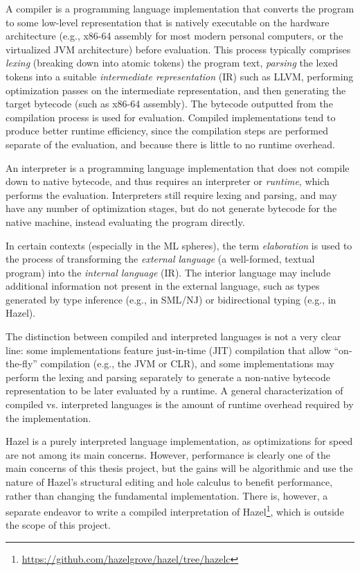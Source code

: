 A compiler is a programming language implementation that converts the program to some low-level representation that is natively executable on the hardware architecture (e.g., x86-64 assembly for most modern personal computers, or the virtualized JVM architecture) before evaluation. This process typically comprises \textit{lexing} (breaking down into atomic tokens) the program text, \textit{parsing} the lexed tokens into a suitable \textit{intermediate representation} (IR) such as LLVM, performing optimization passes on the intermediate representation, and then generating the target bytecode (such as x86-64 assembly). The bytecode outputted from the compilation process is used for evaluation. Compiled implementations tend to produce better runtime efficiency, since the compilation steps are performed separate of the evaluation, and because there is little to no runtime overhead.

An interpreter is a programming language implementation that does not compile down to native bytecode, and thus requires an interpreter or \textit{runtime}, which performs the evaluation. Interpreters still require lexing and parsing, and may have any number of optimization stages, but do not generate bytecode for the native machine, instead evaluating the program directly.


In certain contexts (especially in the ML spheres), the term \textit{elaboration} is used to the process of transforming the \textit{external language} (a well-formed, textual program) into the \textit{internal language} (IR). The interior language may include additional information not present in the external language, such as types generated by type inference (e.g., in SML/NJ) or bidirectional typing (e.g., in Hazel).

The distinction between compiled and interpreted languages is not a very clear line: some implementations feature just-in-time (JIT) compilation that allow ``on-the-fly'' compilation (e.g., the JVM or CLR), and some implementations may perform the lexing and parsing separately to generate a non-native bytecode representation to be later evaluated by a runtime. A general characterization of compiled vs. interpreted languages is the amount of runtime overhead required by the implementation.

Hazel is a purely interpreted language implementation, as optimizations for speed are not among its main concerns. However, performance is clearly one of the main concerns of this thesis project, but the gains will be algorithmic and use the nature of Hazel's structural editing and hole calculus to benefit performance, rather than changing the fundamental implementation. There is, however, a separate endeavor to write a compiled interpretation of Hazel\footnote{\url{https://github.com/hazelgrove/hazel/tree/hazelc}}, which is outside the scope of this project.

